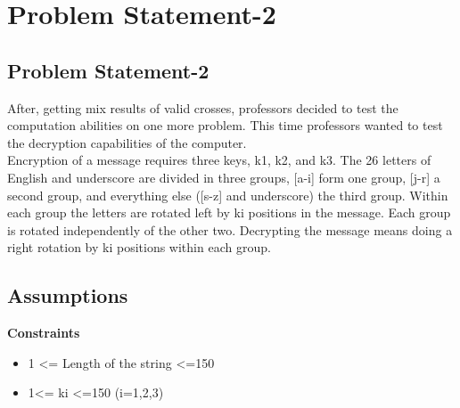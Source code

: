 \documentclass[a4paper,12pt]{article}
\begin{document}
	
		

        
        
\newpage        
\section{\large{Problem Statement-2}}
\subsection{Problem Statement-2}
After, getting mix results of valid crosses, professors decided to test the computation abilities on one more problem. This time professors wanted to test the decryption capabilities of the computer.\\
Encryption of  a message requires three keys, k1, k2, and k3. The 26 letters of English and underscore are divided in three groups,  [a-i] form one group, [j-r] a second group, and everything else ([s-z] and underscore) the third group. Within each group the letters are rotated left by ki positions in the message. Each group is rotated independently of the other two. Decrypting the message means doing a right rotation by ki positions within each group.\\



\subsection{Assumptions}
  \textbf{Constraints}
   \begin{itemize}
   \item 1 <= Length of the string <=150
   \item 1<= ki <=150 (i=1,2,3)
   \end{itemize}

\newpage
\end{document}
